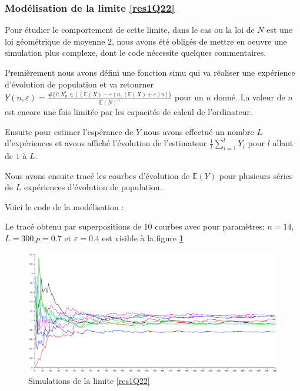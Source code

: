 \documentclass[12pt]{article}
\newcommand{\esp}{\mathbb{E}}
\begin{document}
			\subsubsection*{Modélisation de la limite \ref{res1Q22}}
				Pour étudier le comportement de cette limite, dans le cas ou la loi de $N$ est une loi géométrique de moyenne $2$, nous avons été obligés de mettre en oeuvre une simulation plus complexe, dont le code nécessite quelques commentaires.
				
				Premièrement nous avons défini une fonction \textsf{simu} qui va réaliser une expérience d'évolution de population et va retourner $Y(n,\varepsilon)=\frac{\#\{i:X_n^i\in[(\esp(X)-\varepsilon)n,(\esp(X)+\varepsilon)n]\}}{\esp(N)^n}$  pour un $n$ donné. La valeur de $n$ est encore une fois limitée par les capacités de calcul de l'ordinateur.
				
				Ensuite pour estimer l'espérance de $Y$ nous avons effectué un nombre $L$ d'expériences et avons affiché l'évolution de l'estimateur $\frac{1}{l}\sum\limits_{i=1}^{l}Y_i$ pour $l$ allant de $1$ à $L$.
				
				Nous avons ensuite tracé les courbes d'évolution de $\esp(Y)$ pour plusieurs séries de $L$ expériences d'évolution de population.
				
				Voici le code de la modélisation :
				\begin{mdframed}
						
				\end{mdframed}
				
				Le tracé obtenu par superpositions de 10 courbes avec pour paramètres: $n=14$, $L=300$,$p=0.7$ et $\varepsilon=0.4$ est visible à la figure \ref{fig2.3.2}
				
				\begin{figure}[H]
					\centering
					\caption{Simulations de la limite \ref{res1Q22}\label{fig2.3.2}}
					\includegraphics[width=\textwidth]{../Scilab/Images/2_3_2_2.eps}
				\end{figure}
				
\end{document}
